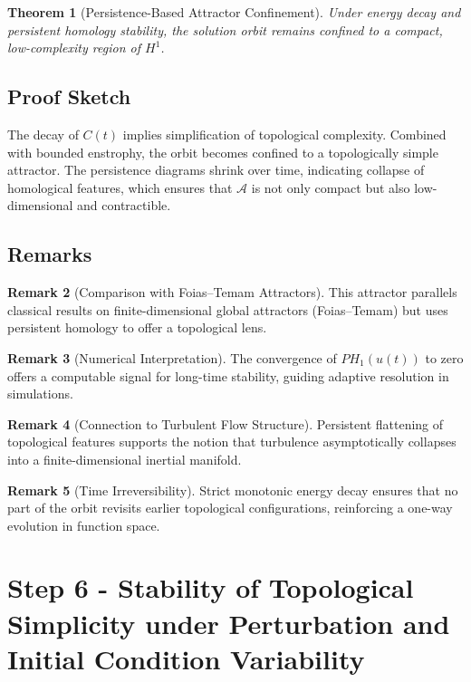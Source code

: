 \documentclass[11pt]{article}
\newtheorem{theorem}{Theorem}[section]
\theoremstyle{definition}
\newtheorem{remark}[theorem]{Remark}
\begin{document}
\begin{theorem}[Persistence-Based Attractor Confinement]
Under energy decay and persistent homology stability, the solution orbit remains confined to a compact, low-complexity region of $H^1$.
\end{theorem}

\subsection*{Proof Sketch}
The decay of $C(t)$ implies simplification of topological complexity. Combined with bounded enstrophy, the orbit becomes confined to a topologically simple attractor. The persistence diagrams shrink over time, indicating collapse of homological features, which ensures that $\mathcal{A}$ is not only compact but also low-dimensional and contractible.

\subsection*{Remarks}

\begin{remark}[Comparison with Foias--Temam Attractors]
This attractor parallels classical results on finite-dimensional global attractors (Foias--Temam) but uses persistent homology to offer a topological lens.
\end{remark}

\begin{remark}[Numerical Interpretation]
The convergence of $PH_1(u(t))$ to zero offers a computable signal for long-time stability, guiding adaptive resolution in simulations.
\end{remark}

\begin{remark}[Connection to Turbulent Flow Structure]
Persistent flattening of topological features supports the notion that turbulence asymptotically collapses into a finite-dimensional inertial manifold.
\end{remark}

\begin{remark}[Time Irreversibility]
Strict monotonic energy decay ensures that no part of the orbit revisits earlier topological configurations, reinforcing a one-way evolution in function space.
\end{remark}


\section{Step 6 - Stability of Topological Simplicity under Perturbation and Initial Condition Variability}
\label{sec:step6}
\end{document}
